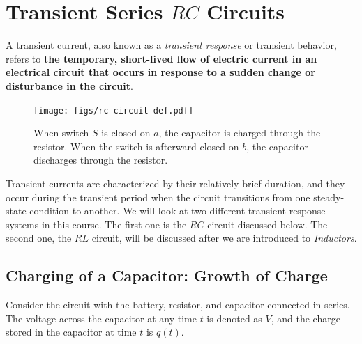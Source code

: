 \documentclass[12pt,b4paper]{article}
\begin{document}
\section{Transient Series $RC$ Circuits}
A transient current, also known as a \textit{transient response} or transient behavior, refers to \textbf{the temporary, short-lived flow of electric current in an electrical circuit that occurs in response to a sudden change or disturbance in the circuit}. 
\begin{figure}
    \centering
    \texttt{[image: figs/rc-circuit-def.pdf]}
    \caption{When switch $S$ is closed on $a$, the capacitor is charged through the resistor. When the switch is afterward closed on $b$, the capacitor discharges through the resistor.}
    \label{fig:rc-circuit-def}
\end{figure}
Transient currents are characterized by their relatively brief duration, and they occur during the transient period when the circuit transitions from one steady-state condition to another. We will look at two different transient response systems in this course. The first one is the $RC$ circuit discussed below. The second one, the $RL$ circuit, will be discussed after we are introduced to \textit{Inductors}.
\subsection{Charging of a Capacitor: Growth of Charge}
Consider the circuit with the battery, resistor, and capacitor connected in series. The voltage across the capacitor at any time $t$ is denoted as $V$, and the charge stored in the capacitor at time $t$ is $q(t)$.
\end{document}
